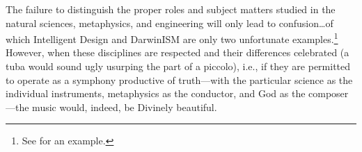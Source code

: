 The failure to distinguish the proper roles and subject matters studied in the natural sciences, metaphysics, and engineering will only lead to confusion\ldots of which Intelligent Design and DarwinISM are only two unfortunate examples.\footnote{See \citet[][p.~372]{sigcell} for an example.} However, when these disciplines are respected and their differences celebrated (a tuba would sound ugly usurping the part of a piccolo), i.e., if they are permitted to operate as a symphony productive of truth---with the particular science as the individual instruments, metaphysics as the conductor, and God as the composer---the music would, indeed, be Divinely beautiful.

